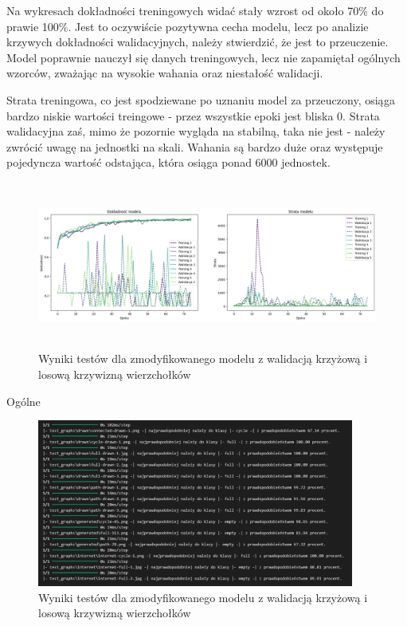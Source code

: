 Na wykresach dokładności treningowych widać stały wzrost od około 70\% do prawie 100\%.
Jest to oczywiście pozytywna cecha modelu, lecz po analizie krzywych dokładności walidacyjnych,
należy stwierdzić, że jest to przeuczenie. Model poprawnie nauczył się danych treningowych,
lecz nie zapamiętał ogólnych wzorców, zważając na wysokie wahania oraz niestałość walidacji.

Strata treningowa, co jest spodziewane po uznaniu model za przeuczony,
osiąga bardzo niskie wartości treingowe - przez wszystkie epoki jest bliska 0.
Strata walidacyjna zaś, mimo że pozornie wygląda na stabilną, taka nie jest
- należy zwrócić uwagę na jednostki na skali. Wahania są bardzo duże oraz występuje pojedyncza wartość odstająca,
która osiąga ponad 6000 jednostek.

\begin{figure}[ht]
	\centering
	\includegraphics[height=5.5cm]{resources/tests/images/v4/crossvalid_2_img.png}
	\caption{Wyniki testów dla zmodyfikowanego modelu z walidacją krzyżową i losową krzywizną wierzchołków}
	\label{Fig:tests-cv-1}
\end{figure}
\FloatBarrier

Ogólne %

\begin{figure}[ht]
	\centering
	\includegraphics[height=5.5cm]{resources/tests/images/v4/crossvalid_2_txt.png}
	\caption{Wyniki testów dla zmodyfikowanego modelu z walidacją krzyżową i losową krzywizną wierzchołków}
	\label{Fig:tests-cv-1}
\end{figure}
\FloatBarrier

